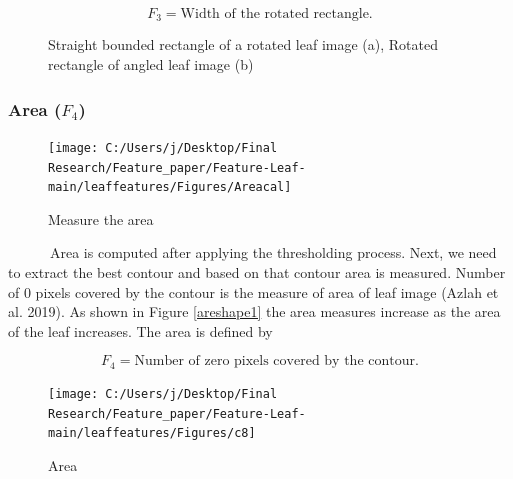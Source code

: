 \documentclass{article}
\begin{document}
\begin{equation}
   F_3 = \text{Width of the rotated rectangle}.
\label{equa_F3}
\end{equation}

\begin{figure}[!ht]

{\centering {}

}

\caption{\label{bound}Straight bounded rectangle of a rotated leaf image (a), Rotated rectangle of angled leaf image (b)}\label{fig:bound}
\end{figure}

\hypertarget{area-f_4}{%
\subsubsection{\texorpdfstring{Area
(\(F_4\))}{Area (F\_4)}}\label{area-f_4}}

\begin{figure}[!ht]

{\centering \texttt{[image: C:/Users/j/Desktop/Final Research/Feature\_paper/Feature-Leaf-main/leaffeatures/Figures/Areacal]} 

}

\caption{\label{areacal}Measure the area}\label{fig:unnamed-chunk-15}
\end{figure}

~~~~~~Area is computed after applying the thresholding process. Next, we
need to extract the best contour and based on that contour area is
measured. Number of 0 pixels covered by the contour is the measure of
area of leaf image (Azlah et al. 2019). As shown in Figure
\ref{areshape1} the area measures increase as the area of the leaf
increases. The area is defined by

\begin{equation}
   F_4 = \text{Number of zero pixels covered by the contour}.
\label{equa_F4}
\end{equation}

\begin{figure}[!ht]

{\centering \texttt{[image: C:/Users/j/Desktop/Final Research/Feature\_paper/Feature-Leaf-main/leaffeatures/Figures/c8]} 

}

\caption{\label{areshape1}Area}\label{fig:unnamed-chunk-16}
\end{figure}
\end{document}
